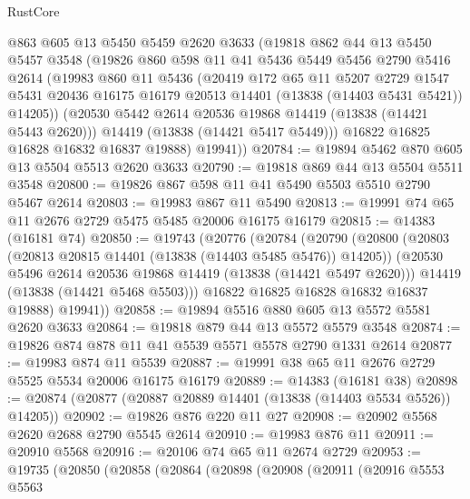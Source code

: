 \begin{lexlean}{RustCore}
\begin{coremodule}
        @863
        @605
        @13
        @5450
        @5459
        @2620
        @3633
        (@19818
          @862
          @44
          @13
          @5450
          @5457
          @3548
          (@19826
            @860
            @598
            @11
            @41
            @5436
            @5449
            @5456
            @2790
            @5416
            @2614
            (@19983
              @860
              @11
              @5436
              (@20419
                @172
                @65
                @11
                @5207
                @2729
                @1547
                @5431
                @20436
                @16175
                @16179
                @20513
                @14401
                (@13838 (@14403 @5431 @5421))
                @14205))
            (@20530 @5442 @2614 @20536 @19868 @14419 (@13838 (@14421 @5443 @2620)))
            @14419
            (@13838 (@14421 @5417 @5449)))
          @16822
          @16825
          @16828
          @16832
          @16837
          @19888)
        @19941))
@20784 := @19894 @5462 @870 @605 @13 @5504 @5513 @2620 @3633
@20790 := @19818 @869 @44 @13 @5504 @5511 @3548
@20800 := @19826 @867 @598 @11 @41 @5490 @5503 @5510 @2790 @5467 @2614
@20803 := @19983 @867 @11 @5490
@20813 := @19991 @74 @65 @11 @2676 @2729 @5475 @5485 @20006 @16175 @16179
@20815 := @14383 (@16181 @74)
@20850 := @19743
    (@20776
      (@20784
        (@20790
          (@20800
            (@20803 (@20813 @20815 @14401 (@13838 (@14403 @5485 @5476)) @14205))
            (@20530 @5496 @2614 @20536 @19868 @14419 (@13838 (@14421 @5497 @2620)))
            @14419
            (@13838 (@14421 @5468 @5503)))
          @16822
          @16825
          @16828
          @16832
          @16837
          @19888)
        @19941))
@20858 := @19894 @5516 @880 @605 @13 @5572 @5581 @2620 @3633
@20864 := @19818 @879 @44 @13 @5572 @5579 @3548
@20874 := @19826 @874 @878 @11 @41 @5539 @5571 @5578 @2790 @1331 @2614
@20877 := @19983 @874 @11 @5539
@20887 := @19991 @38 @65 @11 @2676 @2729 @5525 @5534 @20006 @16175 @16179
@20889 := @14383 (@16181 @38)
@20898 := @20874 (@20877 (@20887 @20889 @14401 (@13838 (@14403 @5534 @5526)) @14205))
@20902 := @19826 @876 @220 @11 @27
@20908 := @20902 @5568 @2620 @2688 @2790 @5545 @2614
@20910 := @19983 @876 @11
@20911 := @20910 @5568
@20916 := @20106 @74 @65 @11 @2674 @2729
@20953 := @19735
    (@20850
      (@20858
        (@20864
          (@20898
            (@20908
              (@20911
                (@20916
                  @5553
                  @5563

\end{coremodule}
\end{lexlean}
